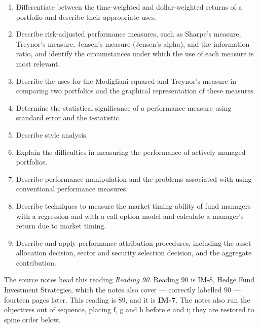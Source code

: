 

\begin{imkeybox}[title={The nine objectives in this reading}]
\begin{enumerate}[label=\textbf{\alph*.}]
\item Differentiate between the time-weighted and dollar-weighted returns of a portfolio and describe their appropriate uses.
\item Describe risk-adjusted performance measures, such as Sharpe's measure, Treynor's measure, Jensen's measure (Jensen's alpha), and the information ratio, and identify the circumstances under which the use of each measure is most relevant.
\item Describe the uses for the Modigliani-squared and Treynor's measure in comparing two portfolios and the graphical representation of these measures.
\item Determine the statistical significance of a performance measure using standard error and the t-statistic.
\item Describe style analysis.
\item Explain the difficulties in measuring the performance of actively managed portfolios.
\item Describe performance manipulation and the problems associated with using conventional performance measures.
\item Describe techniques to measure the market timing ability of fund managers with a regression and with a call option model and calculate a manager's return due to market timing.
\item Describe and apply performance attribution procedures, including the asset allocation decision, sector and security selection decision, and the aggregate contribution.
\end{enumerate}
\end{imkeybox}

\begin{imtrapbox}[breakable=false,title={The reading number, and the order of the letters}]
The source notes head this reading \emph{Reading 90}. Reading 90 is IM-8, Hedge
Fund Investment Strategies, which the notes also cover --- correctly labelled 90
--- fourteen pages later. This reading is 89, and it is \textbf{IM-7}. The notes
also run the objectives out of sequence, placing f, g and h before e and i;
they are restored to spine order below.
\end{imtrapbox}

